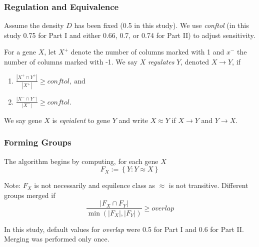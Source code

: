 \documentclass[
	11pt, %
]{beamer}
\begin{document}
\begin{frame}
	\frametitle{Regulation and Equivalence}
    
    Assume the density $D$ has been fixed (0.5 in this study). We use \emph{conftol} (in this study 0.75 for Part I and either 0.66, 0.7, or 0.74 for Part II) to adjust sensitivity.
    
    \bigskip

    \begin{definition}
        For a gene $X$, let $X^{+}$ denote the number of columns marked with 1 and $x^{-}$ the number of columns marked with -1. We say $X$ \emph{regulates} $Y$, denoted $X \rightarrow Y$, if
        \begin{enumerate}
            \item $\frac{\left| X^{+} \cap Y^{+} \right|}{\left| X^{+} \right|} \geq conftol,\ \mathrm{and}$
            \item $\frac{\left| X^{-} \cap Y^{-} \right|}{\left| X^{-} \right|} \geq conftol.$
        \end{enumerate}
    \end{definition}

    \begin{definition}
        We say gene $X$ is \emph{eqvialent} to gene $Y$ and write $X \approx Y$ if $X \rightarrow Y$ and $Y \rightarrow X$.
    \end{definition}
\end{frame}

\begin{frame}
	\frametitle{Forming Groups}

    The algorithm begins by computing, for each gene $X$
    \begin{equation*}
        F_X := \left\{ Y : Y \approx X \right\}
    \end{equation*}

    \bigskip

    Note: $F_X$ is not necessarily and equilence class as $\approx$ is not transitive. Different groups merged if
    \begin{equation*}
        \frac{\left| F_X \cap F_Y \right|}{\min(\left| F_X \right|, \left| F_Y \right|)} \geq overlap
    \end{equation*}

    In this study, default values for \emph{overlap} were 0.5 for Part I and 0.6 for Part II. Merging was performed only once.
\end{frame}
\end{document}
